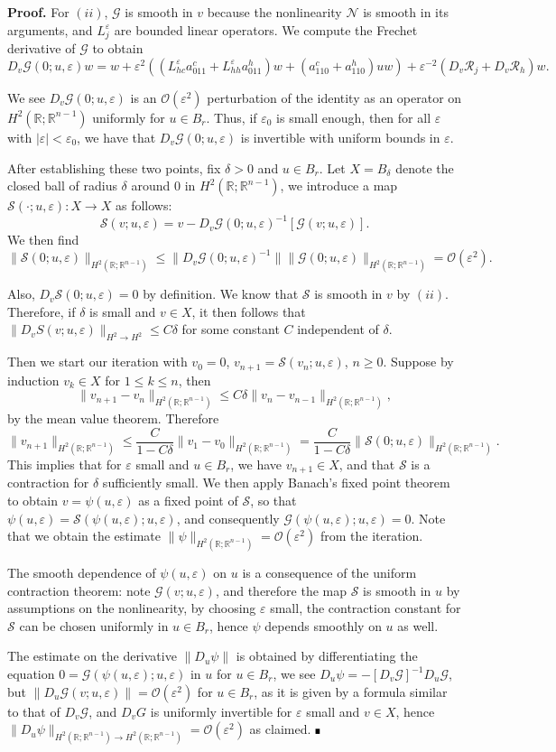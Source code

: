 \documentclass[letterpaper,11pt]{article}
\newcommand{\R}{\mathbb{R}}
\newcommand{\rmO}{\mathcal{O}}
\newcommand{\eps}{\varepsilon}
\newcommand{\Rm}{\mathcal{R}}
\newcommand{\Nl}{\mathcal{N}}
\newcommand{\G}{\mathcal{G}}
\newcommand{\cS}{\mathcal{S}}
\numberwithin{equation}{section}
\theoremstyle{plain}
\theoremstyle{remark}
\newenvironment{Proof}[1][.]%
 {\begin{trivlist}\item[]\textbf{Proof#1 }}%
 {\hspace*{\fill}$\rule{0.3\baselineskip}{0.35\baselineskip}$\end{trivlist}}
\begin{document}
\begin{Proof}
For $(ii)$, $\G$ is smooth in $v$ because the nonlinearity $\Nl$ is smooth in its arguments, and $L_j^\eps$ are bounded linear operators. We compute the Frechet derivative of $\G$ to obtain
\[ 
D_v\G(0;u,\eps) w = w + \eps^2((L_{hc}^\eps a_{011}^c+L_{hh}^\eps a_{011}^h)w+(a_{110}^c+a_{110}^h)u w)+\eps^{-2}(D_v\Rm_j +D_v\Rm_h)w.
\] 

 We see $D_v\G(0; u, \eps)$ is an $\rmO(\eps^2)$ perturbation of the identity as an operator on $H^2(\R;\R^{n-1})$ uniformly for $u\in B_r$. Thus, if $\eps_0$ is small enough, then for all $\eps$ with $|\eps|<\eps_0$, we have that $D_v\G(0;u,\eps)$ is invertible with uniform bounds in $\eps$.


After establishing these two points, fix $\delta>0$ and $u \in B_r$. Let $X=B_\delta$ denote the closed ball of radius $\delta$ around $0$ in $H^2(\R;\R^{n-1})$, we introduce a map $\cS(\cdot; u,\eps): X \to X$ as follows:
\[
\cS(v; u,\eps) = v - D_v\G(0;u, \eps)^{-1}[\G(v;u,\eps)].
\]
We then find
\[
\|\cS(0;u,\eps) \|_{H^2(\R;\R^{n-1})} \le \|D_v\G(0;u, \eps)^{-1}\| \|\G(0;u, \eps)\|_{H^2(\R;\R^{n-1})} = \rmO(\eps^2).
\]

Also, $D_v\cS(0;u,\eps) = 0$ by definition. We know that $\cS$ is smooth in $v$ by $(ii)$. Therefore, if $\delta$ is small and $v\in X$, it then follows that $\|D_vS(v;u,\eps)\|_{H^2\to H^2} \le C\delta$ for some constant $C$ independent of $\delta$.

Then we start our iteration with $v_0 = 0$, $v_{n+1} = \cS(v_n;u,\eps)$, $n\ge 0$. Suppose by induction $v_k \in X$ for $1\le k \le n$, then
\[
\|v_{n+1}-v_n\|_{H^2(\R;\R^{n-1})} \le C\delta\|v_n-v_{n-1}\|_{H^2(\R;\R^{n-1})},
\]
by the mean value theorem. Therefore
\[
\|v_{n+1}\|_{H^2(\R;\R^{n-1})} \le \frac{C}{1-C\delta}\|v_1-v_0\|_{H^2(\R;\R^{n-1})} = \frac{C}{1-C\delta}\|\cS(0;u,\eps)\|_{H^2(\R;\R^{n-1})}.
\]
This implies that for $\eps$ small and $u \in B_r$, we have $v_{n+1} \in X$, and that $\cS$ is a contraction for $\delta$ sufficiently small. We then apply Banach's fixed point theorem to obtain $v = \psi(u,\eps)$ as a fixed point of $\cS$, so that $\psi(u,\eps)= \cS(\psi(u,\eps);u,\eps)$, and consequently $\G(\psi(u,\eps); u,\eps) = 0$. Note that we obtain the estimate $\|\psi\|_{H^2(\R;\R^{n-1})} = \rmO(\eps^2)$ from the iteration.

The smooth dependence of $\psi(u,\eps)$ on $u$ is a consequence of the uniform contraction theorem: note $\G(v;u,\eps)$, and therefore the map $\cS$ is smooth in $u$ by assumptions on the nonlinearity, by choosing $\eps$ small, the contraction constant for $\cS$ can be chosen uniformly in $u \in B_r$, hence $\psi$ depends smoothly on $u$ as well.

The estimate on the derivative $\|D_u\psi\|$ is obtained by differentiating the equation $0 = \G(\psi(u,\eps);u,\eps)$ in $u$ for $u\in B_r$, we see $D_u\psi = -[D_v\G]^{-1}D_u\G$, but $\| D_u \G (v;u,\eps)\|= \rmO(\eps^2)$ for $u \in B_r$, as it is given by a formula similar to that of $D_v\G$, and $D_vG$ is uniformly invertible for $\eps$ small and $v\in X$, hence $\|D_u\psi\|_{H^2(\R;\R^{n-1})\to H^2(\R;\R^{n-1})} = \rmO(\eps^2)$ as claimed. 
\end{Proof}
\end{document}
